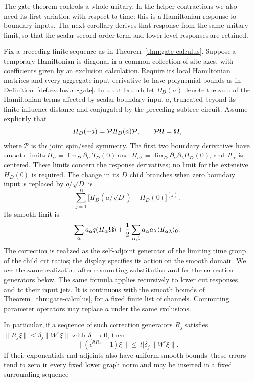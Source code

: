 The gate theorem controls a whole unitary.  In the helper
contractions we also need its first variation with respect to time:
this is a Hamiltonian response to boundary inputs.  The next
corollary derives that response from the same unitary limit, so that
the scalar second-order term and lower-level responses are retained.

\begin{corollary}\label{cor:additive-response}
Fix a preceding finite sequence as in Theorem~\ref{thm:gate-calculus}.
Suppose a temporary Hamiltonian is diagonal in a common
collection of site axes, with coefficients given by an
exclusion calculation.  Require its local Hamiltonian
matrices and every aggregate-input derivative to have
polynomial bounds as in Definition~\ref{def:exclusion-gate}.
In a cut branch let $H_D(a)$ denote
the sum of the Hamiltonian terms affected by scalar
boundary input $a$, truncated beyond its finite influence
distance and conjugated by the preceding subtree circuit.
Assume explicitly that
\begin{equation}\label{eq:additive-response-parity}
                  H_D(-a)=\mathcal{P} H_D(a)\mathcal{P},
                  \qquad \mathcal{P}\boldsymbol\Omega=\boldsymbol\Omega,
\end{equation}
where $\mathscr P$ is the joint spin/seed symmetry.
The first two boundary derivatives have smooth limits
$H_\alpha=\lim_D\partial_\alpha H_D(0)$ and
$H_{\alpha\lambda}=\lim_D\partial_\alpha\partial_\lambda H_D(0)$,
and $H_\alpha$ is centered.  These limits concern the response
derivatives; no limit for the extensive $H_D(0)$ is required.
The change in its $D$ child branches when zero boundary input is
replaced by $a/\sqrt D$ is
\[
 \sum_{j=1}^D
   \bigl[H_D(a/\sqrt D)-H_D(0)\bigr]^{(j)}.
\]
Its smooth limit is
\begin{equation}\label{eq:additive-cut-response}
 \sum_\alpha a_\alpha q(H_\alpha\boldsymbol\Omega)
 +\frac12\sum_{\alpha,\lambda}a_\alpha a_\lambda
                           \langle H_{\alpha\lambda}\rangle_0.
\end{equation}
The correction is realized as the self-adjoint generator of the
limiting time group of the child cut ratios; the display specifies
its action on the smooth domain.  We use the same realization
after commuting substitution and for the correction generators below.
The same formula applies recursively to lower cut responses
and to their input jets.  It is continuous with the smooth
bounds of Theorem~\ref{thm:gate-calculus}, for a fixed finite
list of channels.  Commuting parameter operators may replace
$a$ under the same exclusions.

In particular, if a sequence of such correction generators
$R_j$ satisfies $\|R_j\xi\|\leq\delta_j\|W^r\xi\|$ with
$\delta_j\to0$, then
\begin{equation}\label{eq:small-generator-error}
 \|(e^{\ii tR_j}-1)\xi\|
       \leq |t|\delta_j\|W^r\xi\|.
\end{equation}
If their exponentials and adjoints also have uniform smooth
bounds, these errors tend to zero in every fixed lower
graph norm and may be inserted in a fixed surrounding
sequence.
\end{corollary}

